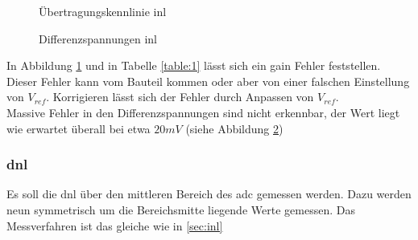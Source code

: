 \documentclass[12pt, a4paper, ngerman]{article}
\begin{document}
\begin{figure}%
  \caption{Übertragungskennlinie \ac{inl}}
  \label{plot:inl}
\end{figure}

\begin{figure}%
  \caption{Differenzspannungen \ac{inl}}
  \label{plot:diff1}
\end{figure}


In Abbildung \ref{plot:inl} und in Tabelle \ref{table:1} lässt sich ein gain Fehler feststellen.
Dieser Fehler kann vom Bauteil kommen oder aber von einer falschen Einstellung von $V_{ref}$.
Korrigieren lässt sich der Fehler durch Anpassen von $V_{ref}$. \\
Massive Fehler in den Differenzspannungen sind nicht erkennbar,
der Wert liegt wie erwartet überall bei etwa $20mV$ (siehe Abbildung \ref{plot:diff1})

\subsubsection{\acl{dnl}}

Es soll die \ac{dnl} über den mittleren Bereich des \ac{adc} gemessen werden.
Dazu werden neun symmetrisch um die Bereichsmitte liegende Werte gemessen.
Das Messverfahren ist das gleiche wie in \ref{sec:inl}
\end{document}
